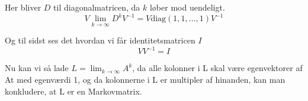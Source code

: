 Her bliver $D$ til diagonalmatricen, da $k$ løber mod uendeligt. 
$$V \lim_{k \rightarrow \infty} D^k V^{-1} = V \text{diag}(1, 1, \dots, 1) V^{-1} $$

Og til sidst ses det hvordan vi får identitetsmatricen $I$
$$ VV^{-1} = I$$

Nu kan vi så lade $L = \lim_{k \rightarrow \infty} A^k$, da alle kolonner i L skal være egenvektorer af At med egenværdi 1, og da kolonnerne i L er multipler af hinanden, kan man konkludere, at L er en Markovmatrix.









